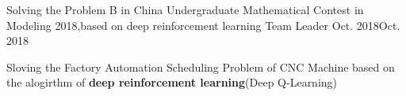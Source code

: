 
\begin{projitem}
    {Solving the Problem B in China Undergraduate Mathematical Contest in Modeling 2018,based on deep reinforcement learning}
    {Team Leader}
    {Oct. 2018}{Oct. 2018 }
    \item Sloving the Factory Automation Scheduling Problem of CNC Machine based on the alogirthm of \textbf{deep reinforcement learning}(Deep Q-Learning)
\end{projitem}
\endinput